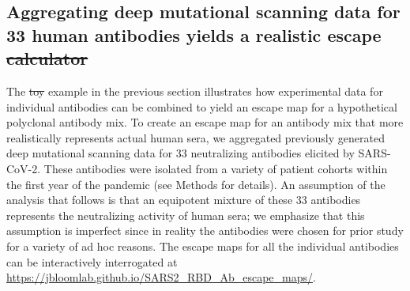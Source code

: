 \documentclass[9pt,twocolumn,twoside]{gsajnl_modified}
\providecommand{\DIFadd}[1]{{\protect\color{blue}\uwave{#1}}} %
\providecommand{\DIFdel}[1]{{\protect\color{red}\sout{#1}}}                      %
\providecommand{\DIFaddbegin}{} %
\providecommand{\DIFaddend}{} %
\providecommand{\DIFdelbegin}{} %
\providecommand{\DIFdelend}{} %
\begin{document}
\subsection{Aggregating deep mutational scanning data for 33 human antibodies yields a realistic escape \DIFdelbegin \DIFdel{calculator}\DIFdelend \DIFaddbegin \DIFadd{estimator}\DIFaddend }
The \DIFdelbegin \DIFdel{toy }\DIFdelend \DIFaddbegin \DIFadd{illustrative }\DIFaddend example in the previous section illustrates how experimental data for individual antibodies can be combined to yield an escape map for a hypothetical polyclonal antibody mix.
To create an escape map for an antibody mix that more realistically represents actual human sera, we aggregated previously generated deep mutational scanning data for 33 neutralizing antibodies elicited by SARS-CoV-2.
These antibodies were isolated from a variety of patient cohorts within the first year of the pandemic (see Methods for details).
An assumption of the analysis that follows is that an equipotent mixture of these 33 antibodies represents the neutralizing activity of human sera; we emphasize that this assumption is imperfect since in reality the antibodies were chosen for prior study for a variety of ad hoc reasons.
The escape maps for all the individual antibodies can be interactively interrogated at \url{https://jbloomlab.github.io/SARS2_RBD_Ab_escape_maps/}.
\end{document}
